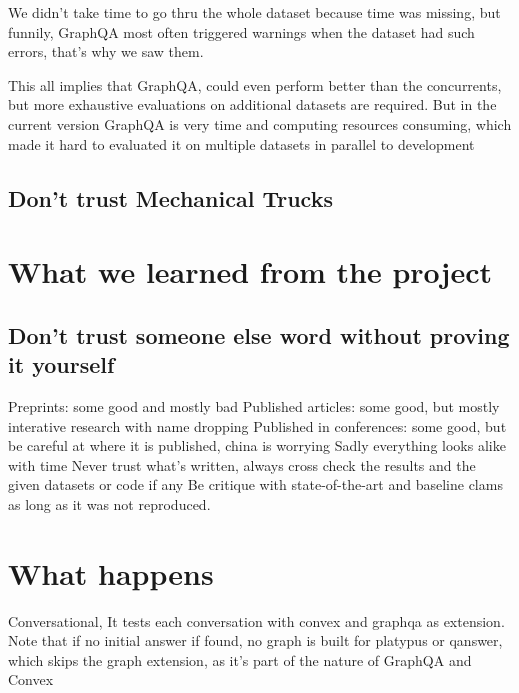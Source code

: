 We didn't take time to go thru the whole dataset because time was missing, but funnily, GraphQA most often triggered warnings when the dataset had such errors, that's why we saw them.

This all implies that GraphQA, could even perform better than the concurrents, but more exhaustive evaluations on additional datasets are required. But in the current version GraphQA is very time and computing resources consuming, which made it hard to evaluated it on multiple datasets in parallel to development 


\subsection{Don't trust Mechanical Trucks}


\section{What we learned from the project}
\subsection{Don't trust someone else word without proving it yourself}
Preprints: some good and mostly bad
Published articles: some good, but mostly interative research with name dropping
Published in conferences: some good, but be careful at where it is published, china is worrying
Sadly everything looks alike with time
Never trust what's written, always cross check the results and the given datasets or code if any
Be critique with state-of-the-art and baseline clams as long as it was not reproduced.


\section{What happens}

Conversational,
It tests each conversation with convex and graphqa as extension.
Note that if no initial answer if found, no graph is built for platypus or qanswer, which skips the graph extension, as it's part of the nature of GraphQA and Convex
